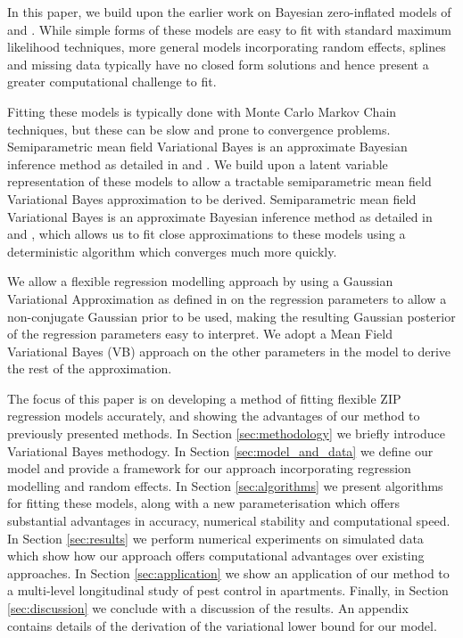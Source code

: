\documentclass{article}[12pt]
\begin{document}
\noindent In this paper, we build upon the earlier work on Bayesian zero-inflated models of
\cite{Ghosh20061360} and \cite{VatsaWilson2014}. While simple forms of these models are easy to fit with
standard maximum likelihood techniques, more general models incorporating random effects, splines and missing
data typically have no closed form solutions and hence present a greater computational challenge to fit.

\noindent Fitting these models is typically done with Monte Carlo Markov Chain techniques, but these can be
slow and prone to convergence problems. Semiparametric mean field Variational Bayes is an approximate Bayesian
inference method as detailed in \cite{ormerod10} and \cite{RohdeWand2015}. We build upon a latent variable
representation of these models to allow a tractable semiparametric mean field Variational Bayes approximation
to be derived. Semiparametric mean field Variational Bayes is an approximate Bayesian inference method as
detailed in \cite{ormerod10} and \cite{RohdeWand2015}, which allows us to fit close approximations to these
models using a deterministic algorithm which converges much more quickly.

\noindent We allow a flexible regression modelling approach by using a Gaussian Variational Approximation as
defined in \cite{ormerod09} on the regression parameters to allow a non-conjugate Gaussian prior to be used,
making the resulting Gaussian posterior of the regression parameters easy to interpret. We adopt a Mean Field
Variational Bayes (VB) approach on the other parameters in the model to derive the rest of the approximation.

\noindent The focus of this paper is on developing a method of fitting flexible ZIP regression models
accurately, and showing the advantages of our method to previously presented methods. In Section
\ref{sec:methodology} we briefly introduce Variational Bayes methodogy. In Section \ref{sec:model_and_data} we
define our model and provide a framework for our approach incorporating regression modelling and random
effects. In Section \ref{sec:algorithms} we present algorithms for fitting these models, along with a new
parameterisation which offers substantial advantages in accuracy, numerical stability and computational speed.
In Section \ref{sec:results} we perform numerical experiments on simulated data which show how our approach
offers computational advantages over existing approaches. In Section \ref{sec:application} we show an
application of our method to a multi-level longitudinal study of pest control in apartments. Finally, in
Section \ref{sec:discussion} we conclude with a discussion of the results. An appendix contains details of the
derivation of the variational lower bound for our model.
\end{document}
